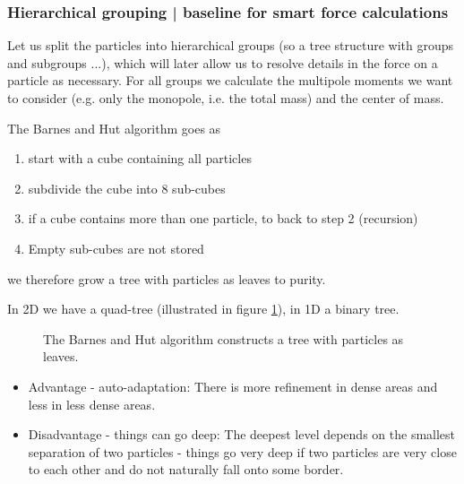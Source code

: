 \subsubsection{Hierarchical grouping | baseline for smart force calculations}
Let us split the particles into hierarchical groups (so a tree structure
with groups and subgroups ...), which will later allow
us to resolve details in the force on a particle as necessary. For all groups
we calculate the multipole moments we want to consider (e.g. only the monopole, i.e.
the total mass) and the center of mass.

The Barnes and Hut algorithm goes as
\begin{enumerate}
    \item start with a cube containing all particles
    \item subdivide the cube into 8 sub-cubes
    \item if a cube contains more than one particle, to back to step 2 (recursion)
    \item Empty sub-cubes are not stored
\end{enumerate}
we therefore grow a tree with particles as leaves to purity.

In 2D we have a quad-tree (illustrated in figure \ref{fig:quad_tree}), in 1D a binary tree.

\begin{figure}[H]
    \centering
    
    \caption{The Barnes and Hut algorithm constructs a tree with particles as leaves.}
    \label{fig:quad_tree}
\end{figure}

\begin{itemize}
    \item \textcolor{green1}{Advantage - auto-adaptation}: There is more refinement in dense areas and less in less dense areas.
    \item \textcolor{red1}{Disadvantage - things can go deep}: The deepest level depends on the smallest separation of two particles - things go very deep if two particles are very close to each other and do not naturally fall onto some border.
\end{itemize}

